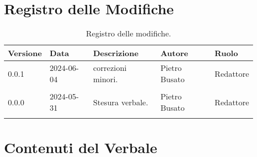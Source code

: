 \documentclass[8pt]{article}
\begin{document}
\section*{Registro delle Modifiche}
\begin{table}[ht!]	
	\centering
	\begin{tabular}{p{1.2cm} p{2cm} p{6cm} p{3cm} p{2cm}}
		\toprule
		\textbf{Versione}& \textbf{Data} & \textbf{Descrizione} & \textbf{Autore} & \textbf{Ruolo} \\
		\midrule
		0.0.1 & 2024-06-04 & correzioni minori. & Pietro Busato & Redattore \\\\ 
		0.0.0 & 2024-05-31 & Stesura verbale.  & Pietro Busato & Redattore \\\\ %
		\bottomrule
	\end{tabular}
	\caption{Registro delle modifiche.}
	\label{table:Registro delle modifiche}
\end{table}
\newpage
\tableofcontents
\clearpage
\newpage
\justifying
\section{Contenuti del Verbale}
\end{document}
